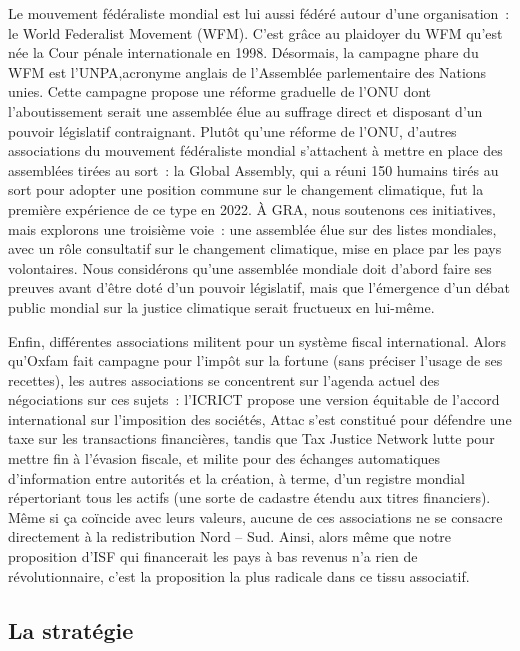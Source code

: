 \documentclass[a5paper,french]{memoir}
\begin{document}
Le mouvement fédéraliste mondial est lui aussi fédéré autour d'une organisation~: le World Federalist Movement (WFM). C'est grâce au plaidoyer du WFM qu'est née la Cour pénale internationale en 1998. Désormais, la campagne phare du WFM est l'UNPA,acronyme anglais de l'Assemblée parlementaire des Nations unies. Cette campagne propose une réforme graduelle de l'ONU dont l'aboutissement serait une assemblée élue au suffrage direct et disposant d'un pouvoir législatif contraignant. Plutôt qu'une réforme de l'ONU, d'autres associations du mouvement fédéraliste mondial s'attachent à mettre en place des assemblées tirées au sort~: la Global Assembly, qui a réuni 150 humains tirés au sort pour adopter une position commune sur le changement climatique, fut la première expérience de ce type en 2022. À GRA, nous soutenons ces initiatives, mais explorons une troisième voie~: une assemblée élue sur des listes mondiales, avec un rôle consultatif sur le changement climatique, mise en place par les pays volontaires. Nous considérons qu'une assemblée mondiale doit d'abord faire ses preuves avant d'être doté d'un pouvoir législatif, mais que l'émergence d'un débat public mondial sur la justice climatique serait fructueux en lui-même. 

Enfin, différentes associations militent pour un système fiscal international. Alors qu'Oxfam fait campagne pour l'impôt sur la fortune (sans préciser l'usage de ses recettes), les autres associations se concentrent sur l'agenda actuel des négociations sur ces sujets~: l'ICRICT propose une version équitable de l'accord international sur l'imposition des sociétés, Attac s'est constitué pour défendre une taxe sur les transactions financières, tandis que Tax Justice Network lutte pour mettre fin à l'évasion fiscale, et milite pour des échanges automatiques d'information entre autorités et la création, à terme, d'un registre mondial répertoriant tous les actifs (une sorte de cadastre étendu aux titres financiers). Même si ça coïncide avec leurs valeurs, aucune de ces associations ne se consacre directement à la redistribution Nord -- Sud. Ainsi, alors même que notre proposition d'ISF qui financerait les pays à bas revenus n'a rien de révolutionnaire, c'est la proposition la plus radicale dans ce tissu associatif. 

\subsection{La stratégie}
\end{document}
